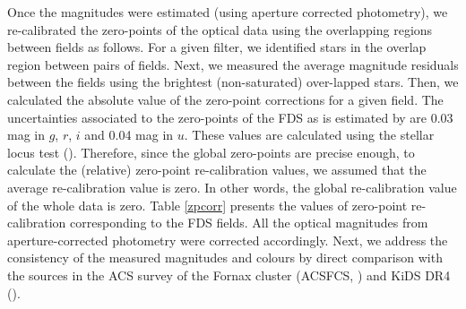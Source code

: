 \documentclass[fleqn,usenatbib]{mnras}
\begin{document}
Once the magnitudes were estimated (using aperture corrected photometry), we re-calibrated the zero-points of the optical data using the overlapping regions between fields as follows. For a given filter, we identified stars in the overlap region between pairs of fields. Next, we measured the average magnitude residuals between the fields using the brightest (non-saturated) over-lapped stars. Then, we calculated the absolute value of the zero-point corrections for a given field. The uncertainties associated to the zero-points of the FDS as is estimated by \citet{venhola2018} are 0.03 mag in $g$, $r$, $i$ and 0.04 mag in $u$. These values are calculated using the stellar locus test (\citealp{ivezic}). Therefore, since the global zero-points are precise enough, to calculate the (relative) zero-point re-calibration values, we assumed that the average re-calibration value is zero. In other words, the global re-calibration value of the whole data is zero. Table \ref{zpcorr} presents the values of zero-point re-calibration corresponding to the FDS fields. All the optical magnitudes from aperture-corrected photometry were corrected accordingly. Next, we address the consistency of the measured magnitudes and colours by direct comparison with the sources in the ACS survey of the Fornax cluster (ACSFCS, \citealp{jordan2015}) and KiDS DR4 (\citealp{kids-dr4}). 
\end{document}

